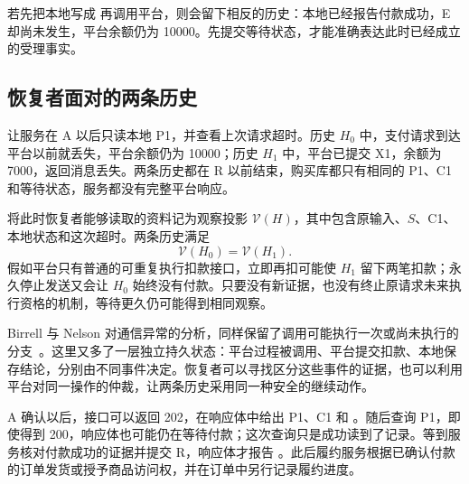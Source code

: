 若先把本地写成  再调用平台，则会留下相反的历史：本地已经报告付款成功，E 却尚未发生，平台余额仍为 10000。先提交等待状态，才能准确表达此时已经成立的受理事实。

\subsection*{恢复者面对的两条历史}

让服务在 A 以后只读本地 P1，并查看上次请求超时。历史 \(H_0\) 中，支付请求到达平台以前就丢失，平台余额仍为 10000；历史 \(H_1\) 中，平台已提交 X1，余额为 7000，返回消息丢失。两条历史都在 R 以前结束，购买库都只有相同的 P1、C1 和等待状态，服务都没有完整平台响应。


将此时恢复者能够读取的资料记为观察投影 \(\mathcal V(H)\)，其中包含原输入、\(S\)、C1、本地状态和这次超时。两条历史满足
\[
 \mathcal V(H_0)=\mathcal V(H_1).
\]
假如平台只有普通的可重复执行扣款接口，立即再扣可能使 \(H_1\) 留下两笔扣款；永久停止发送又会让 \(H_0\) 始终没有付款。只要没有新证据，也没有终止原请求未来执行资格的机制，等待更久仍可能得到相同观察。

Birrell 与 Nelson 对通信异常的分析，同样保留了调用可能执行一次或尚未执行的分支~\cite{rpc}。这里又多了一层独立持久状态：平台过程被调用、平台提交扣款、本地保存结论，分别由不同事件决定。恢复者可以寻找区分这些事件的证据，也可以利用平台对同一操作的仲裁，让两条历史采用同一种安全的继续动作。

A 确认以后，接口可以返回 202，在响应体中给出 P1、C1 和 。随后查询 P1，即使得到 200，响应体也可能仍在等待付款；这次查询只是成功读到了记录。等到服务核对付款成功的证据并提交 R，响应体才报告 。此后履约服务根据已确认付款的订单发货或授予商品访问权，并在订单中另行记录履约进度。
